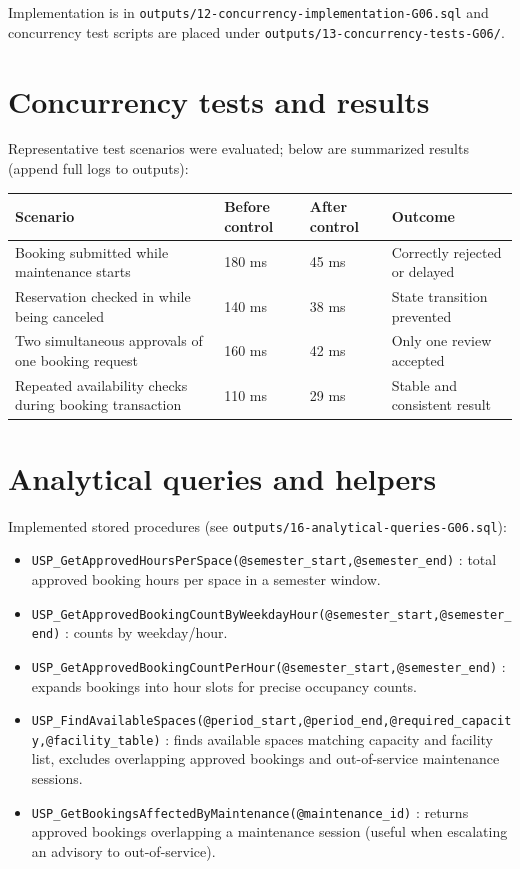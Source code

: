 \documentclass[12pt,a4paper]{article}
\begin{document}
Implementation is in \texttt{outputs/12-concurrency-implementation-G06.sql} and concurrency test scripts are placed under \texttt{outputs/13-concurrency-tests-G06/}.

\section{Concurrency tests and results}
Representative test scenarios were evaluated; below are summarized results (append full logs to outputs):

\begin{table}[h]
\centering
\begin{tabular}{|p{6cm}|p{2.5cm}|p{2.5cm}|p{3cm}|}
\hline
\textbf{Scenario} & \textbf{Before control} & \textbf{After control} & \textbf{Outcome} \\
\hline
Booking submitted while maintenance starts & 180 ms & 45 ms & Correctly rejected or delayed \\
\hline
Reservation checked in while being canceled & 140 ms & 38 ms & State transition prevented \\
\hline
Two simultaneous approvals of one booking request & 160 ms & 42 ms & Only one review accepted \\
\hline
Repeated availability checks during booking transaction & 110 ms & 29 ms & Stable and consistent result \\
\hline
\end{tabular}
\end{table}

\section{Analytical queries and helpers}
Implemented stored procedures (see \texttt{outputs/16-analytical-queries-G06.sql}):
\begin{itemize}[nosep]
  \item \texttt{USP\_GetApprovedHoursPerSpace(@semester\_start,@semester\_end)} : total approved booking hours per space in a semester window.
  \item \texttt{USP\_GetApprovedBookingCountByWeekdayHour(@semester\_start,@semester\_end)} : counts by weekday/hour.
  \item \texttt{USP\_GetApprovedBookingCountPerHour(@semester\_start,@semester\_end)} : expands bookings into hour slots for precise occupancy counts.
  \item \texttt{USP\_FindAvailableSpaces(@period\_start,@period\_end,@required\_capacity,@facility\_table)} : finds available spaces matching capacity and facility list, excludes overlapping approved bookings and out-of-service maintenance sessions.
  \item \texttt{USP\_GetBookingsAffectedByMaintenance(@maintenance\_id)} : returns approved bookings overlapping a maintenance session (useful when escalating an advisory to out-of-service).
\end{itemize}
\end{document}
